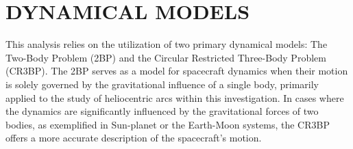 \chapter{DYNAMICAL MODELS}

This analysis relies on the utilization of two primary dynamical models: The Two-Body Problem (2BP)
and the Circular Restricted Three-Body Problem (CR3BP). The 2BP serves as a model for spacecraft
dynamics when their motion is solely governed by the gravitational influence of a single body,
primarily applied to the study of heliocentric arcs within this investigation. In cases where the
dynamics are significantly influenced by the gravitational forces of two bodies, as exemplified in
Sun-planet or the Earth-Moon systems, the CR3BP offers a more accurate description of the
spacecraft's motion.






